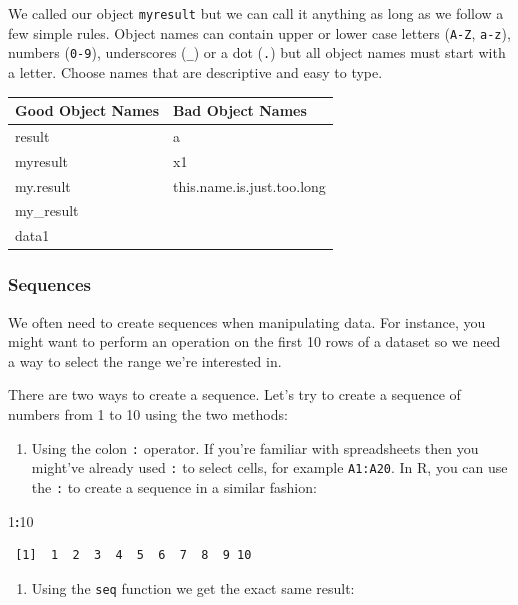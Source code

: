 \documentclass[]{article}
\newenvironment{Shaded}{\begin{snugshade}}{\end{snugshade}}
\newcommand{\DecValTok}[1]{\textcolor[rgb]{0.00,0.00,0.81}{#1}}
\newcommand{\OperatorTok}[1]{\textcolor[rgb]{0.81,0.36,0.00}{\textbf{#1}}}
\providecommand{\tightlist}{%
  \setlength{\itemsep}{0pt}\setlength{\parskip}{0pt}}
\theoremstyle{definition}
\theoremstyle{definition}
\theoremstyle{definition}
\theoremstyle{remark}
\begin{document}
We called our object \texttt{myresult} but we can call it anything as
long as we follow a few simple rules. Object names can contain upper or
lower case letters (\texttt{A-Z}, \texttt{a-z}), numbers (\texttt{0-9}),
underscores (\texttt{\_}) or a dot (\texttt{.}) but all object names
must start with a letter. Choose names that are descriptive and easy to
type.

\begin{longtable}[]{@{}ll@{}}
\toprule
Good Object Names & Bad Object Names\tabularnewline
\midrule
\endhead
result & a\tabularnewline
myresult & x1\tabularnewline
my.result & this.name.is.just.too.long\tabularnewline
my\_result &\tabularnewline
data1 &\tabularnewline
\bottomrule
\end{longtable}

\subsubsection{Sequences}\label{sequences}

We often need to create sequences when manipulating data. For instance,
you might want to perform an operation on the first 10 rows of a dataset
so we need a way to select the range we're interested in.

There are two ways to create a sequence. Let's try to create a sequence
of numbers from 1 to 10 using the two methods:

\begin{enumerate}
\def\labelenumi{\arabic{enumi}.}
\tightlist
\item
  Using the colon \texttt{:} operator. If you're familiar with
  spreadsheets then you might've already used \texttt{:} to select
  cells, for example \texttt{A1:A20}. In R, you can use the \texttt{:}
  to create a sequence in a similar fashion:
\end{enumerate}

\begin{Shaded}
\begin{Highlighting}[]
\DecValTok{1}\OperatorTok{:}\DecValTok{10}
\end{Highlighting}
\end{Shaded}

\begin{verbatim}
 [1]  1  2  3  4  5  6  7  8  9 10
\end{verbatim}

\begin{enumerate}
\def\labelenumi{\arabic{enumi}.}
\tightlist
\item
  Using the \texttt{seq} function we get the exact same result:
\end{enumerate}
\end{document}
